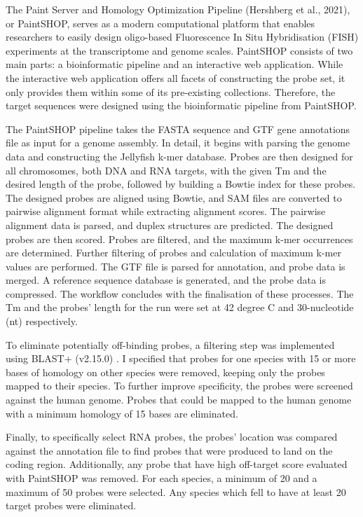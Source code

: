 \documentclass[10pt,letterpaper]{article}
\begin{document}
\noindent The Paint Server and Homology Optimization Pipeline (Hershberg et al., 2021), or PaintSHOP, serves as a modern computational platform that enables researchers to easily design oligo-based Fluorescence In Situ Hybridisation (FISH) experiments at the transcriptome and genome scales. PaintSHOP consists of two main parts: a bioinformatic pipeline and an interactive web application. While the interactive web application offers all facets of constructing the probe set, it only provides them within some of its pre-existing collections. Therefore, the target sequences were designed using the bioinformatic pipeline from PaintSHOP.

\noindent The PaintSHOP pipeline takes the FASTA sequence and GTF gene annotations file as input for a genome assembly. In detail, it begins with parsing the genome data and constructing the Jellyfish k-mer database. Probes are then designed for all chromosomes, both DNA and RNA targets, with the given Tm and the desired length of the probe, followed by building a Bowtie index for these probes. The designed probes are aligned using Bowtie, and SAM files are converted to pairwise alignment format while extracting alignment scores. The pairwise alignment data is parsed, and duplex structures are predicted. The designed probes are then scored. Probes are filtered, and the maximum k-mer occurrences are determined. Further filtering of probes and calculation of maximum k-mer values are performed. The GTF file is parsed for annotation, and probe data is merged. A reference sequence database is generated, and the probe data is compressed. The workflow concludes with the finalisation of these processes. The Tm and the probes’ length for the run were set at 42 degree C and 30-nucleotide (nt) respectively.


\noindent To eliminate potentially off-binding probes, a filtering step was implemented using BLAST+ (v2.15.0) \parencite{camacho-2009}. I specified that probes for one species with 15 or more bases of homology on other species were removed, keeping only the probes mapped to their species. To further improve specificity, the probes were screened against the human genome. Probes that could be mapped to the human genome with a minimum homology of 15 bases are eliminated. 

\noindent Finally, to specifically select RNA probes, the probes’ location was compared against the annotation file to find probes that were produced to land on the coding region. Additionally, any probe that have high off-target score evaluated with PaintSHOP was removed. For each species, a minimum of 20 and a maximum of 50 probes were selected. Any species which fell to have at least 20 target probes were eliminated.
\end{document}
